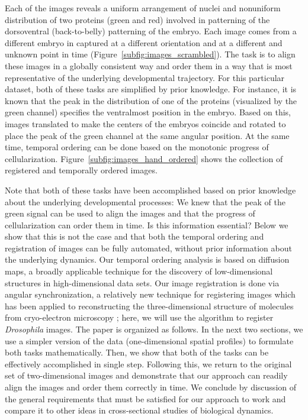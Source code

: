\documentclass{pnastwo}
\begin{document}
\begin{article}
Each of the images reveals a uniform arrangement of nuclei and nonuniform distribution of two proteins (green and red) involved in patterning of the dorsoventral (back-to-belly) patterning of the embryo. 
%
Each image comes from a different embryo in captured at a different orientation and at a different and unknown point in time (Figure~\ref{subfig:images_scrambled}). 
%
The task is to align these images in a globally consistent way and order them in a way that is most representative of the underlying developmental trajectory. 
%
For this particular dataset, both of these tasks are simplified by prior knowledge. 
%
For instance, it is known that the peak in the distribution of one of the proteins (visualized by the green channel) specifies the ventralmost position in the embryo. 
%
Based on this, images translated to make the centers of the embryos coincide and rotated to place the peak of the green channel at the same angular position. 
%
At the same time, temporal ordering can be done based on the monotonic progress of cellularization. 
%
Figure~\ref{subfig:images_hand_ordered} shows the collection of registered and temporally ordered images. 

Note that both of these tasks have been accomplished based on prior knowledge about the underlying developmental processes: We knew that the peak of the green signal can be used to align the images and that the progress of cellularization can order them in time. 
%
Is this information essential? 
%
Below we show that this is not the case and that both the temporal ordering and registration of images can be fully automated, without prior information about the underlying dynamics. 
%
Our temporal ordering analysis is based on diffusion maps, a broadly applicable technique for the discovery of low-dimensional structures in high-dimensional data sets.
%
Our image registration is done via angular synchronization, a relatively new technique for registering images which has been applied to reconstructing the three-dimensional structure of molecules from cryo-electron microscopy \cite{singer2011three}; here, we will use the algorithm to register {\em Drosophila} images.
%
The paper is organized as follows. 
%
In the next two sections, we use a simpler version of the data (one-dimensional spatial profiles) to formulate both tasks mathematically.  
%
Then, we show that both of the tasks can be effectively accomplished in single step. 
%
Following this, we return to the original set of two-dimensional images and demonstrate that our approach can readily align the images and order them correctly in time. 
%
We conclude by discussion of the general requirements that must be satisfied for our approach to work and compare it to other ideas in cross-sectional studies of biological dynamics. 



\end{article}
\end{document}
